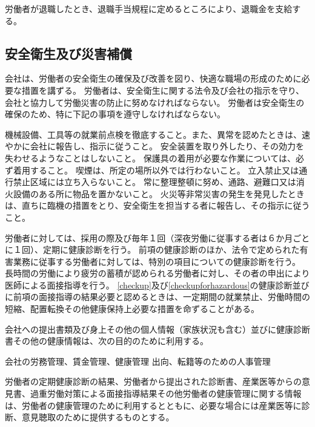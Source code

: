 \documentclass[10pt,a4paper,uplatex]{jsarticle}
\begin{document}
労働者が退職したとき、退職手当規程に定めるところにより、退職金を支給する。
\label{para:severance}

\subsection{安全衛生及び災害補償}

会社は、労働者の安全衛生の確保及び改善を図り、快適な職場の形成のために必要な措置を講ずる。
\term
労働者は、安全衛生に関する法令及び会社の指示を守り、会社と協力して労働災害の防止に努めなければならない。
\term
労働者は安全衛生の確保のため、特に下記の事項を遵守しなければならない。
\begin{enumerate}
    \itm 機械設備、工具等の就業前点検を徹底すること。また、異常を認めたときは、速やかに会社に報告し、指示に従うこと。
    \itm 安全装置を取り外したり、その効力を失わせるようなことはしないこと。
    \itm 保護具の着用が必要な作業については、必ず着用すること。
    \itm 喫煙は、所定の場所以外では行わないこと。
    \itm 立入禁止又は通行禁止区域には立ち入らないこと。
    \itm 常に整理整頓に努め、通路、避難口又は消火設備のある所に物品を置かないこと。
    \itm 火災等非常災害の発生を発見したときは、直ちに臨機の措置をとり、安全衛生を担当する者に報告し、その指示に従うこと。
\end{enumerate}

労働者に対しては、採用の際及び毎年１回（深夜労働に従事する者は６か月ごとに１回）、定期に健康診断を行う。
\label{checkup}
\term
 前項の健康診断のほか、法令で定められた有害業務に従事する労働者に対しては、特別の項目についての健康診断を行う。
\label{checkupforhazardous}
\term
長時間の労働により疲労の蓄積が認められる労働者に対し、その者の申出により医師による面接指導を行う。
\term
\ref{checkup}及び\ref{checkupforhazardous}の健康診断並びに前項の面接指導の結果必要と認めるときは、一定期間の就業禁止、労働時間の短縮、配置転換その他健康保持上必要な措置を命ずることがある。

会社への提出書類及び身上その他の個人情報（家族状況も含む）並びに健康診断書その他の健康情報は、次の目的のために利用する。
\begin{enumerate}
    \itm 会社の労務管理、賃金管理、健康管理
    \itm 出向、転籍等のための人事管理
\end{enumerate}
\term
労働者の定期健康診断の結果、労働者から提出された診断書、産業医等からの意見書、過重労働対策による面接指導結果その他労働者の健康管理に関する情報は、労働者の健康管理のために利用するとともに、必要な場合には産業医等に診断、意見聴取のために提供するものとする。
\end{document}
